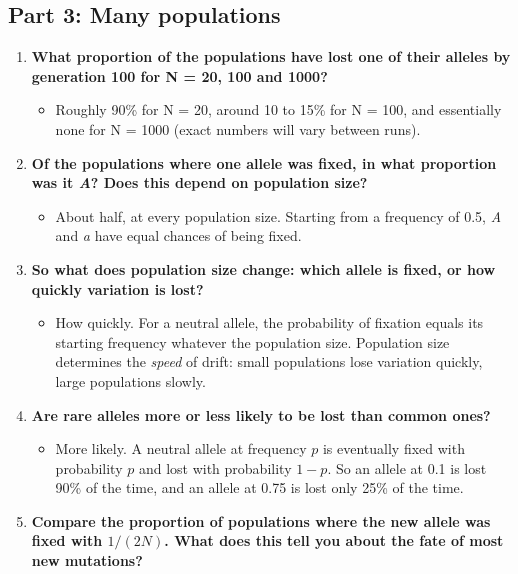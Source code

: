 \documentclass[
  a4paper]{book}
\newcounter{none} %
\providecommand{\tightlist}{%
  \setlength{\itemsep}{0pt}\setlength{\parskip}{0pt}}
\begin{document}
\subsection{Part 3: Many populations}\label{part-3-many-populations-1}

\begin{enumerate}
\def\labelenumi{\arabic{enumi}.}
\tightlist
\item
  \textbf{What proportion of the populations have lost one of their alleles by generation 100 for N = 20, 100 and 1000?}

  \begin{itemize}
  \tightlist
  \item
    Roughly 90\% for N = 20, around 10 to 15\% for N = 100, and essentially none for N = 1000 (exact numbers will vary between runs).
  \end{itemize}
\item
  \textbf{Of the populations where one allele was fixed, in what proportion was it \emph{A}? Does this depend on population size?}

  \begin{itemize}
  \tightlist
  \item
    About half, at every population size. Starting from a frequency of 0.5, \emph{A} and \emph{a} have equal chances of being fixed.
  \end{itemize}
\item
  \textbf{So what does population size change: which allele is fixed, or how quickly variation is lost?}

  \begin{itemize}
  \tightlist
  \item
    How quickly. For a neutral allele, the probability of fixation equals its starting frequency whatever the population size. Population size determines the \emph{speed} of drift: small populations lose variation quickly, large populations slowly.
  \end{itemize}
\item
  \textbf{Are rare alleles more or less likely to be lost than common ones?}

  \begin{itemize}
  \tightlist
  \item
    More likely. A neutral allele at frequency \(p\) is eventually fixed with probability \(p\) and lost with probability \(1 - p\). So an allele at 0.1 is lost 90\% of the time, and an allele at 0.75 is lost only 25\% of the time.
  \end{itemize}
\item
  \textbf{Compare the proportion of populations where the new allele was fixed with \(1/(2N)\). What does this tell you about the fate of most new mutations?}


\end{enumerate}
\end{document}
